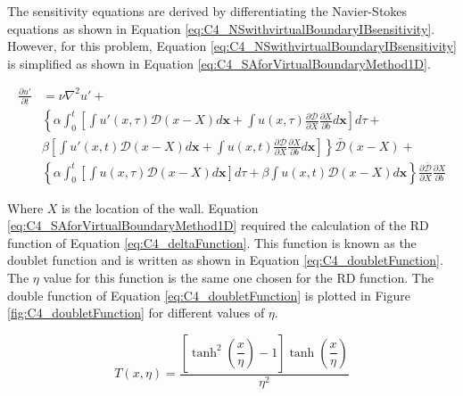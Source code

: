 The sensitivity equations are derived by differentiating the Navier-Stokes equations as shown in Equation \eqref{eq:C4_NSwithvirtualBoundaryIBsensitivity}. However, for this problem, Equation \eqref{eq:C4_NSwithvirtualBoundaryIBsensitivity} is simplified as shown in Equation \eqref{eq:C4_SAforVirtualBoundaryMethod1D}.

\begin{align}\label{eq:C4_SAforVirtualBoundaryMethod1D}
    \frac{\partial u'}{\partial t}
    &= 
    \nu \nabla^2 u' + \nonumber \\
    &\left\{
    \alpha
    \int_0^t
    \left[
        \int u'(x, \tau) \mathcal{D}(x - X) d\mathbf{x} + 
        \int u(x, \tau) \frac{\partial \mathcal{D}}{\partial X} \frac{\partial X}{\partial b} d\mathbf{x}
    \right] d\tau \right.
    + \nonumber \\
    &
    \left.
    \beta
    \left[
    \int u'(x, t) \mathcal{D}(x - X) d\mathbf{x} +
    \int u(x, t) \frac{\partial \mathcal{D}}{\partial X} \frac{\partial X}{\partial b} d\mathbf{x}
    \right]
    \right\} \bar{\mathcal{D}}(x - X) + \nonumber \\
    &\left\{
    \alpha
    \int_0^t
    \left[
        \int u(x, \tau) \mathcal{D}(x - X) d\mathbf{x}
    \right] d\tau
    +
    \beta
    \int u(x, t) \mathcal{D}(x - X) d\mathbf{x}
    \right\}
    \frac{\partial \bar{\mathcal{D}}}{\partial X} \frac{\partial X}{\partial b}
\end{align}

Where $X$ is the location of the wall. Equation \eqref{eq:C4_SAforVirtualBoundaryMethod1D} required the calculation of the RD function of Equation \eqref{eq:C4_deltaFunction}. This function is known as the doublet function \cite{kamaraju2009linear} and is written as shown in Equation \eqref{eq:C4_doubletFunction}. The $\eta$ value for this function is the same one chosen for the RD function. The double function of Equation \eqref{eq:C4_doubletFunction} is plotted in Figure \ref{fig:C4_doubletFunction} for different values of $\eta$.

\begin{equation}\label{eq:C4_doubletFunction}
    T(x, \eta) = 
    \frac{\left[ \tanh^{2}{\left(\dfrac{x}{\eta} \right)} - 1 \right] \tanh{\left( \dfrac{x}{\eta} \right)}}{\eta^2} 
\end{equation}

